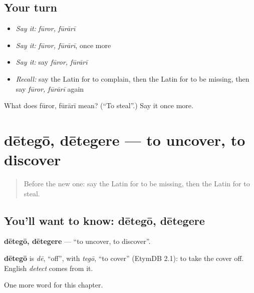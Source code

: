 \subsection*{Your turn}
\begin{itemize}
\raggedright
  \item \emph{Say it:} \emph{fūror, fūrārī}
  \item \emph{Say it:} \emph{fūror, fūrārī}, once more
  \item \emph{Say it:} say \emph{fūror, fūrārī}
  \item \emph{Recall:} say the Latin for to complain, then the Latin for to be missing, then say \emph{fūror, fūrārī} again
\end{itemize}

\begin{tcolorbox}[breakable,colback=teal!4,colframe=teal!35!black,title={Before you move on}]
What does fūror, fūrārī mean? (\textquotedblleft{}To steal\textquotedblright{}.) Say it once more.
\end{tcolorbox}
\section[dētegō, dētegere]{dētegō, dētegere — to uncover, to discover}

\label{lesson:LA-C232-detego}



\begin{quote}
Before the new one: say the Latin for to be missing, then the Latin for to steal.
\end{quote}

\subsection*{You'll want to know: dētegō, dētegere}
\textbf{dētegō, dētegere} — \textquotedblleft{}to uncover, to discover\textquotedblright{}.

\begin{cousinweb}
\textbf{dētegō} is \emph{dē}, \textquotedblleft{}off\textquotedblright{}, with \emph{tegō}, \textquotedblleft{}to cover\textquotedblright{} (EtymDB 2.1): to take the cover off. English \emph{detect} comes from it.
\end{cousinweb}

\begin{grammarlens}[title={What you've built}]
One more word for this chapter.
\end{grammarlens}

